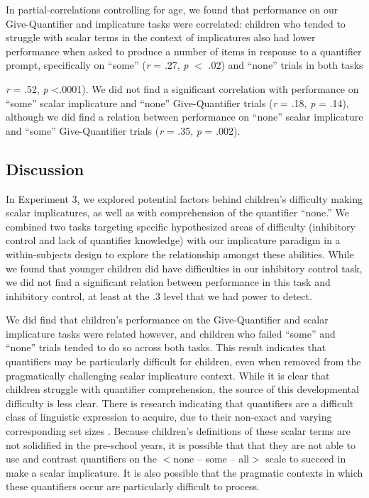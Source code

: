 \documentclass[man]{apa2}
\begin{document}
In partial-correlations controlling for age, we found that performance on our Give-Quantifier and implicature tasks were correlated: children who tended to struggle with scalar terms in the context of implicatures also had lower performance when asked to produce a number of items in response to a quantifier prompt, specifically on ``some''  (\textit{r} = .27, \textit{p} $<$ .02) and ``none'' trials in both tasks {\textit{r} = .52, \textit{p} \textless .0001). We did not find a significant correlation with performance on ``some'' scalar implicature and ``none'' Give-Quantifier trials (\textit{r} = .18, \textit{p} = .14), although we did find a relation between performance on ``none'' scalar implicature and ``some'' Give-Quantifier trials (\textit{r} = .35, \textit{p} = .002). 



\subsection{Discussion}

In Experiment 3, we explored potential factors behind children's difficulty making scalar implicatures, as well as with comprehension of the quantifier ``none.'' We combined two tasks targeting specific hypothesized areas of difficulty (inhibitory control and lack of quantifier knowledge) with our implicature paradigm in a within-subjects design to explore the relationship amongst these abilities. While we found that younger children did have difficulties in our inhibitory control task, we did not find a significant relation between performance in this task and inhibitory control, at least at the .3 level that we had power to detect.

We did find that children's performance on the Give-Quantifier and scalar implicature tasks were related however, and children who failed ``some'' and ``none'' trials tended to do so across both tasks. This result indicates that quantifiers may be particularly difficult for children, even when removed from the pragmatically challenging scalar implicature context. While it is clear that children struggle with quantifier comprehension, the source of this developmental difficulty is less clear. There is research indicating that quantifiers are a difficult class of linguistic expression to acquire, due to their non-exact and varying corresponding set sizes \cite{hurewitz2009}. Because children's definitions of these scalar terms are not solidified in the pre-school years, it is possible that that they are not able to use and contrast quantifiers on the $<${\sc none -- some -- all}$>$ scale to succeed in make a scalar implicature. It is also possible that the pragmatic contexts in which these quantifiers occur are particularly difficult to process.

}
\end{document}
